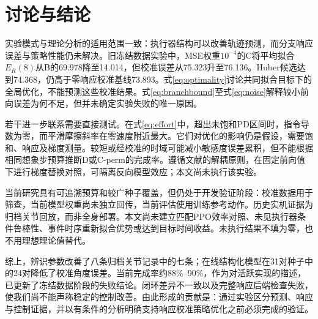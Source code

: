 \section{讨论与结论}
实验模式与理论分析的适用范围一致：执行器结构可以改善轨迹预测，而分支响应误差与策略性能仍未解决。旧冻结数据实验中，MSE权重$10^{-4}$的C将平均拟合$E_R(8)$从B的69.978降至14.014，但校准误差从75.323升至76.136。Huber候选达到74.368，仍高于零响应校准基线73.893。式\eqref{eq:optimality}讨论共同拟合目标下的全局优化，不能预测这些校准结果。式\eqref{eq:branchbound}至式\eqref{eq:noise}解释较小前向误差为何不足，但并未确定实验失败的唯一原因。

若干进一步联系需要直接测试。在式\eqref{eq:effort}中，超出未饱和PD区间时，指令导数为零，而平滑摩擦斜率在零速度附近最大。它们对优化的影响仍是假设，需要饱和、响应及梯度测量。较短或经校准的时域可能减小敏感度误差累积，但不能根据相同想象步预算推断D或C-perm的完成率。遵循文献\cite{dmo}的解耦原则，在固定前向值下进行梯度替换对照，可隔离反向模型效应；本文尚未执行该实验。

当前研究具有可追溯预算和较广种子覆盖，但仍处于开发验证阶段：校准数据用于筛查，当前模型权重尚未独立回传，当前评估使用训练参考动作。历史实机证据为归档关节回放，而非全身部署。本文尚未建立匹配PPO效率对照、未见执行器条件鲁棒性、事件时序重新拟合优势或达到目标时间收益。未执行结果不填为零，也不用理想理论值替代。

综上，辨识参数改善了八条归档关节记录中的七条；在线结构化模型在31对种子中的24对降低了校准角度误差。当前完成率约88\%--90\%，作为对活跃实现的描述，已更新了冻结数据阶段的失败结论。闭环差异不一致以及完整响应后端检查失败，使我们尚不能声称稳定的控制改善。由此形成的贡献是：通过实验区分预测、响应与控制证据，并以有条件的分析明确支持响应校准策略优化之前必须完成的验证。
